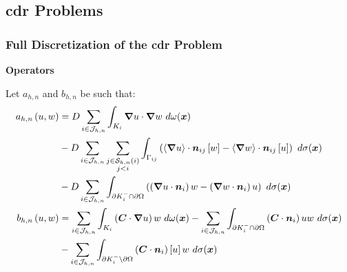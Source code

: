 \subsection*{\texorpdfstring{\acrlong{cdr}}{} Problems}

\begin{frame}
    \frametitle{Full Discretization of the \acrshort{cdr} Problem}

    \vspace*{\fill}
    \begin{center}
        {\color{\accentcolor} \Large \textbf{Operators}}
        \vspace*{0.25cm}

        \begin{minipage}{0.75\textwidth}
            \begin{definition}
                Let $a_{h, n}$ and $b_{h, n}$ be such that:
                \begin{align*}
                    a_{h, n} \left( u, w \right) &= D \sum_{i \in \mathcal{J}_{h, n}} \int_{K_i} \bm{\nabla} u \cdot \bm{\nabla} w ~ d \omega(\bm{x}) \\
                    &- D \sum_{i \in \mathcal{J}_{h, n}} \sum_{\substack{j \in \mathcal{S}_{h, n}(i) \\ j < i}} \int_{\Gamma_{ij}} \left( \left\langle \bm{\nabla} u \right\rangle \cdot \bm{n}_{ij} \left[ w \right] - \left\langle \bm{\nabla} w \right\rangle \cdot \bm{n}_{ij} \left[ u \right] \right) ~ d \sigma(\bm{x}) \\
                    &- D \sum_{i \in \mathcal{J}_{h, n}} \int_{\partial K_i^- \cap \partial \Omega} \left( \left( \bm{\nabla} u \cdot \bm{n}_i \right) w - \left( \bm{\nabla} w \cdot \bm{n}_i \right) u \right) ~ d \sigma(\bm{x}) \\
                    b_{h, n} \left( u, w \right) &= \sum_{i \in \mathcal{J}_{h, n}} \int_{K_i} \left( \bm{C} \cdot \bm{\nabla} u \right) w ~ d \omega(\bm{x}) - \sum_{i \in \mathcal{J}_{h, n}} \int_{\partial K_i^- \cap \partial \Omega} \left( \bm{C} \cdot \bm{n}_i \right) u w ~ d \sigma(\bm{x}) \\
                    &- \sum_{i \in \mathcal{J}_{h, n}} \int_{\partial K_i^- \setminus \partial \Omega} \left( \bm{C} \cdot \bm{n}_i \right) \left[ u \right] w ~ d \sigma(\bm{x})
                \end{align*}
            \end{definition}
        \end{minipage}
    \end{center}
    \vspace*{\fill}
    
\end{frame}

